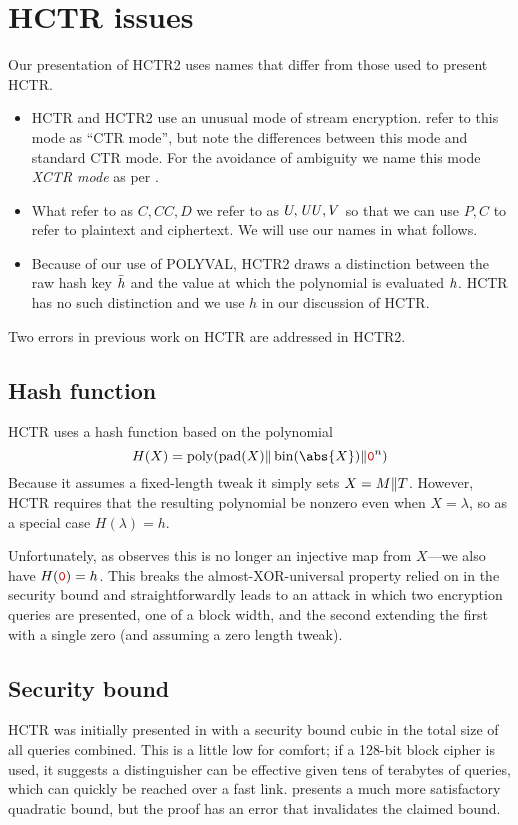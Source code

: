 \documentclass[hctr2.tex]{subfiles}
\begin{document}
\section{HCTR issues}
Our presentation of HCTR2 uses
names that differ from those used to present HCTR\@.

\begin{itemize}
    \item HCTR and HCTR2 use an unusual mode of stream encryption.
    \cite{hctr,hctrquad} refer to this mode as ``CTR mode'',
    but note the differences between this mode and 
    standard CTR mode\cite{ctr}.
    For the avoidance of ambiguity
    we name this mode \emph{XCTR mode} as per \cite{hmc}.
    \item What \cite{hctr,hctrquad} refer to as \(C, \mathit{CC}, D\)
    we refer to as \(U, \mathit{UU}, V\)
    so that we can use \(P, C\) to refer to plaintext and ciphertext.
    We will use our names in what follows.
    \item Because of our use of POLYVAL, HCTR2 draws a distinction
    between the raw hash key \(\bar{h}\)
    and the value at which the polynomial is evaluated \(h\).
    HCTR has no such distinction
    and we use \(h\) in our discussion of HCTR\@.
\end{itemize}

Two errors in previous work on HCTR are addressed in HCTR2.

\subsection{Hash function}\label{badhash}
HCTR uses a hash function based on the polynomial
\begin{displaymath}
    H(X) = \poly(\pad(X) \Concat \fromint(\abs{X}) \Concat \bino^n)
\end{displaymath}
Because it assumes a fixed-length tweak it simply sets \(X = M \Vert T\).
However, HCTR requires that the resulting polynomial be nonzero
even when \(X = \lambda\),
so as a special case \(H(\lambda) = h\).

Unfortunately, as \cite{kumarhctr} observes this is no longer
an injective map from \(X\)---we also have \(H(\bino) = h\). This
breaks the almost-XOR-universal property relied on
in the security bound and
straightforwardly leads to an attack in which two encryption queries
are presented, one of a block width, and the second extending
the first with a single zero (and assuming a zero length tweak).

\subsection{Security bound}\label{badproof}
HCTR was initially presented in \cite{hctr} with a security bound cubic
in the total size of all queries combined.  This is a little low
for comfort; if a 128-bit block cipher is used, it suggests a
distinguisher can be effective given tens of terabytes of queries,
which can quickly be reached over a fast link. 
\cite{hctrquad} presents a much more satisfactory quadratic bound,
but the proof has an error that invalidates the claimed bound.
\end{document}
